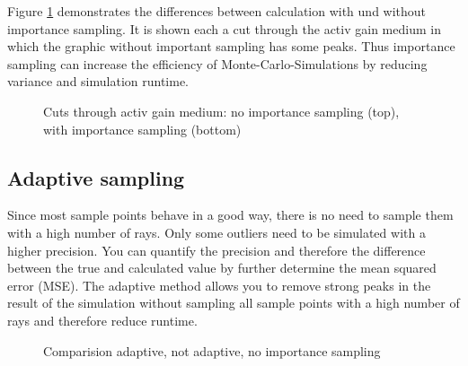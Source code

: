 Figure \ref{graphic:importance} demonstrates
the differences between calculation with und without
importance sampling. It is shown each a cut through the activ 
gain medium in which the graphic without important
sampling has some peaks. Thus importance 
sampling can increase the efficiency of Monte-Carlo-Simulations 
by reducing variance and simulation runtime. 
\begin{figure}
  \centerline
  {}
  \caption{Cuts through activ gain medium: no importance sampling (top), with importance sampling (bottom)}
  \label{graphic:importance}
\end{figure}

\subsection{Adaptive sampling}
Since most sample points behave in a good way, there is no need
to sample them with a high number of rays. Only some outliers need to
be simulated with a higher precision. You can quantify the precision
and therefore the difference between the true and calculated value by
further determine the mean squared error (MSE).
The adaptive method allows you to remove strong peaks in the result
of the simulation without sampling all sample points with
a high number of rays and therefore reduce runtime.
\begin{figure}
  \centerline{
    }
  \caption{Comparision adaptive, not adaptive, no importance sampling}
  \label{plot:adaptive}
\end{figure}

